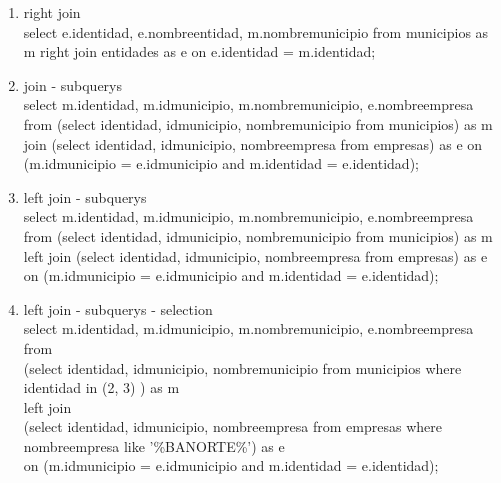 \documentclass[10pt]{article}         %
\begin{document}
\begin{enumerate}
\item right join \\
select e.identidad, e.nombreentidad, m.nombremunicipio from municipios as m right join entidades as e on e.identidad = m.identidad;

\item join - subquerys \\

select m.identidad, m.idmunicipio, m.nombremunicipio, e.nombreempresa from (select identidad, idmunicipio, nombremunicipio from municipios) as m join (select identidad, idmunicipio, nombreempresa from empresas) as e on (m.idmunicipio = e.idmunicipio and m.identidad = e.identidad);

\item left join - subquerys \\

select m.identidad, m.idmunicipio, m.nombremunicipio, e.nombreempresa from (select identidad, idmunicipio, nombremunicipio from municipios) as m left join (select identidad, idmunicipio, nombreempresa from empresas) as e on (m.idmunicipio = e.idmunicipio and m.identidad = e.identidad); \\

\item left join - subquerys - selection \\

select m.identidad, m.idmunicipio, m.nombremunicipio, e.nombreempresa from \\
 (select identidad, idmunicipio, nombremunicipio from municipios where identidad in (2, 3) ) as m \\
 left join \\
  (select identidad, idmunicipio, nombreempresa from empresas where nombreempresa like '\%BANORTE\%') as e \\
  on (m.idmunicipio = e.idmunicipio and m.identidad = e.identidad);
  
\end{enumerate}
\end{document}
